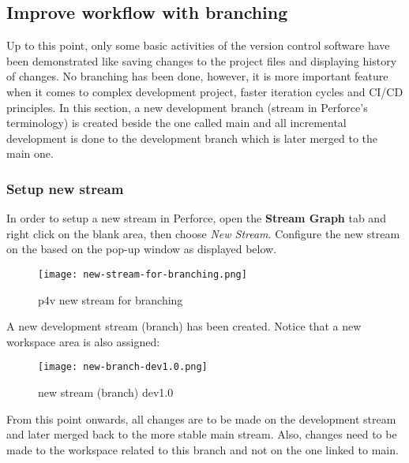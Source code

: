 \subsection{Improve workflow with branching}
Up to this point, only some basic activities of the version control software have been
demonstrated like saving changes to the project files and displaying history of changes. No branching
has been done, however, it is more important feature when it comes to complex development project, faster iteration cycles and
CI/CD principles. In this section, a new development branch (stream in Perforce's terminology) is created beside the one
called main and all incremental development is done to the development branch which is later merged to the main one.
\subsubsection{Setup new stream}
In order to setup a new stream in Perforce, open the \textbf{Stream Graph} tab and right click on the blank area, then choose
\textit{New Stream}. Configure the new stream on the based on the pop-up window as displayed below.
\begin{figure}[H]
    \centering
    \texttt{[image: new-stream-for-branching.png]}
    \caption{p4v new stream for branching}
    \label{fig:new-stream-for-branching}
\end{figure}
A new development stream (branch) has been created. Notice that a new workspace area is also assigned:
\begin{figure}[H]
    \centering
    \texttt{[image: new-branch-dev1.0.png]}
    \caption{new stream (branch) dev1.0}
    \label{fig:new-branch-dev1.0}
\end{figure}
From this point onwards, all changes are to be made on the development stream and later merged back to the more stable
main stream. Also, changes need to be made to the workspace related to this branch and not on the one linked to main.

